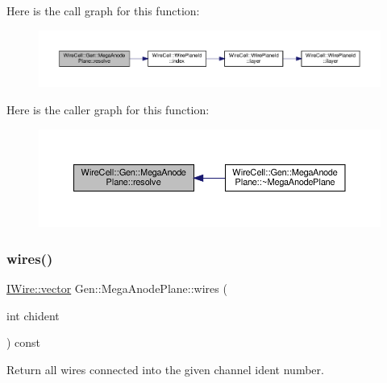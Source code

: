 Here is the call graph for this function\+:
\nopagebreak
\begin{figure}[H]
\begin{center}
\leavevmode
\includegraphics[width=350pt]{class_wire_cell_1_1_gen_1_1_mega_anode_plane_a39f210db553e1e981412c2c44861870c_cgraph}
\end{center}
\end{figure}
Here is the caller graph for this function\+:
\nopagebreak
\begin{figure}[H]
\begin{center}
\leavevmode
\includegraphics[width=350pt]{class_wire_cell_1_1_gen_1_1_mega_anode_plane_a39f210db553e1e981412c2c44861870c_icgraph}
\end{center}
\end{figure}
\mbox{\label{class_wire_cell_1_1_gen_1_1_mega_anode_plane_a1d4b6dd24d9b2d805120eed53e153bc3}} 
\subsubsection{\texorpdfstring{wires()}{wires()}}
{\footnotesize\ttfamily \hyperlink{class_wire_cell_1_1_i_data_ae1a9f863380499bb43f39fabb6276660}{I\+Wire\+::vector} Gen\+::\+Mega\+Anode\+Plane\+::wires (\begin{DoxyParamCaption}\item[{int}]{chident }\end{DoxyParamCaption}) const\hspace{0.3cm}{\ttfamily [virtual]}}



Return all wires connected into the given channel ident number. 



